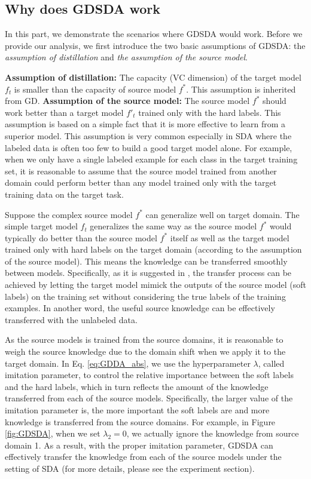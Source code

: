 \subsection{Why does GDSDA work}
In this part, we demonstrate the scenarios where GDSDA would work. Before we provide our analysis, we first introduce the two basic assumptions of GDSDA: the \textit{assumption of distillation} and \textit{the assumption of the source model}.

\textbf{Assumption of distillation:} The capacity (VC dimension) of the target model $f_t$ is smaller than the capacity of source model $f^*$. This assumption is inherited from GD.
\textbf{Assumption of the source model:} The source model $f^*$ should work better than a target model $f'_t$ trained only with the hard labels. 
This assumption is based on a simple fact that it is more effective to learn from a superior model. This assumption is very common especially in SDA where the labeled data is often too few to build a good target model alone.
For example, when we only have a single labeled example for each class in the target training set, it is reasonable to assume that the source model trained from another domain could perform better than any model trained only with the target training data on the target task. %

Suppose the complex source model $f^*$ can generalize well on target domain. The simple target model $f_t$ generalizes the same way as the source model $f^*$ would typically do better than the source model $f^*$ itself as well as the target model trained only with hard labels on the target domain (according to the assumption of the source model). This means the knowledge can be transferred smoothly between models. Specifically, as it is suggested in \cite{hinton2015distilling}, the transfer process can be achieved by letting the target model mimick the outputs of the source model (soft labels) on the training set without considering the true labels of the training examples. In another word, the useful source knowledge can be effectively transferred with the unlabeled data.

As the source models is trained from the source domains, it is reasonable to weigh the source knowledge due to the domain shift\cite{karl2001long} when we apply it to the target domain. In Eq. \eqref{eq:GDDA_abs}, we use the hyperparameter $\lambda$, called imitation parameter, to control the relative importance between the soft labels and the hard labels, which in turn reflects the amount of the knowledge transferred from each of the source models. Specifically, the larger value of the imitation parameter is, the more important the soft labels are and more knowledge is transferred from the source domains. 
For example, in Figure \ref{fig:GDSDA}, when we set $\lambda_2=0$, we actually ignore the knowledge from source domain 1.
As a result, with the proper imitation parameter, GDSDA can effectively transfer the knowledge from each of the source models under the setting of SDA (for more details, please see the experiment section).

